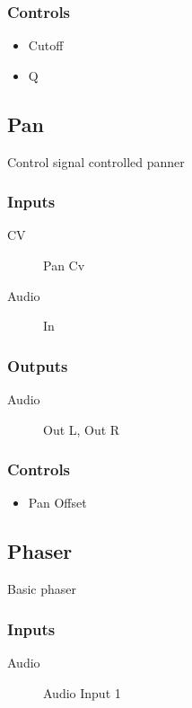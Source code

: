 \subsubsection{Controls}
\begin{itemize}
\item Cutoff
\item Q
\end{itemize}

\subsection{Pan}

Control signal controlled panner



\subsubsection{Inputs}
\begin{description}
\item [CV] Pan Cv
\item [Audio] In
\end{description}

\subsubsection{Outputs}
\begin{description}
\item [Audio] Out L, Out R
\end{description}

\subsubsection{Controls}
\begin{itemize}
\item Pan Offset
\end{itemize}

\subsection{Phaser}

Basic phaser



\subsubsection{Inputs}
\begin{description}
\item [Audio] Audio Input 1
\end{description}

